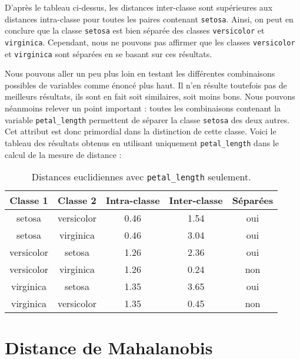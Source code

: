 \documentclass[french]{report}
\begin{document}
    D'après le tableau ci-dessus, les distances inter-classe sont supérieures aux distances intra-classe pour toutes les paires contenant \texttt{setosa}.
    Ainsi, on peut en conclure que la classe \texttt{setosa} est bien séparée des classes \texttt{versicolor} et \texttt{virginica}.
    Cependant, nous ne pouvons pas affirmer que les classes \texttt{versicolor} et \texttt{virginica} sont séparées en se basant sur ces résultats.
    
    Nous pouvons aller un peu plus loin en testant les différentes combinaisons possibles de variables comme énoncé plus haut.
    Il n'en résulte toutefois pas de meilleurs résultats, ils sont en fait soit similaires, soit moins bons.
    Nous pouvons néanmoins relever un point important : toutes les combinaisons contenant la variable \texttt{petal\_length} permettent de séparer la classe \texttt{setosa} des deux autres.
    Cet attribut est donc primordial dans la distinction de cette classe.
    Voici le tableau des résultats obtenus en utilisant uniquement \texttt{petal\_length} dans le calcul de la mesure de distance :
    
    \begin{table}[h]
        \centering
        \begin{tabular}{||c c c c c||}
            \hline
            \textbf{Classe 1} & \textbf{Classe 2} & \textbf{Intra-classe} & \textbf{Inter-classe} & \textbf{Séparées} \\
            \hline\hline
            setosa & versicolor & 0.46 & 1.54 & {\color{ForestGreen}oui} \\
            setosa & virginica & 0.46 & 3.04 & {\color{ForestGreen}oui} \\
            \hline
            versicolor & setosa & 1.26 & 2.36 & {\color{ForestGreen}oui} \\
            versicolor & virginica & 1.26 & 0.24 & {\color{BrickRed}non} \\
            \hline
            virginica & setosa & 1.35 & 3.65 & {\color{ForestGreen}oui} \\
            virginica & versicolor & 1.35 & 0.45 & {\color{BrickRed}non} \\
            \hline
        \end{tabular}
        \caption{Distances euclidiennes avec \texttt{petal\_length} seulement.}
    \end{table}
    
    \section{Distance de Mahalanobis}
    
\end{document}
